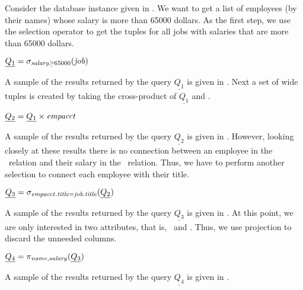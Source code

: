 \begin{example}
\label{eg:ra}
Consider the database instance given in . We want to get a list
of employees (by their names) whose salary is more than 65000 dollars. 
As the first step, we use the selection operator to get the tuples for all jobs with salaries that 
are more than 65000 dollars.\\
%
\centerline{
\ensuremath{
\underline{Q_1} = \sigma_{\salary \ge 65000} (\job)
}}
%
\noindent
A sample of the results returned by the query $\underline{Q_1}$ is given in .
Next a set of 
wide tuples is created by taking the cross-product of $\underline{Q_1}$
and \empacct.\\
%
\centerline{
\ensuremath{
\underline{Q_2} = \underline{Q_1} \times \empacct
}}
%
\noindent
A sample of the results returned by the query $\underline{Q_2}$ is given in .
However, looking closely at these results there is no connection between an employee
in the \empacct\ relation and their salary in the \job\ relation. Thus, we have to perform 
another selection to connect each employee with their title. \\
%
\centerline{
\ensuremath{
\underline{Q_3} = \sigma_{\empacct.\titleatt=\job.\titleatt} (\underline{Q_2})
}}
%
\noindent
A sample of the results returned by the query $\underline{Q_3}$ is given in .
At this point, we are only interested in two attributes, that is, \name\ and \salary.
Thus, we use projection to discard the unneeded columns.\\
%
\centerline{
\ensuremath{
\underline{Q_4} = \pi_{\name, \salary} (\underline{Q_3} )
}}
%
A sample of the results returned by the query $\underline{Q_4}$ is given in .
\end{example}



